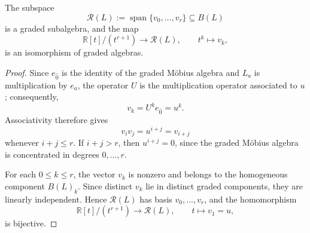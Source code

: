 \documentclass[10pt,a4paper]{amsart}
\DeclareMathOperator{\Span}{span}
\newcommand{\R}{\mathbb{R}}
\newcommand{\cc}{\mathcal}
\begin{document}
\begin{prop}\label{prop:radial-core}
The subspace
\[
\cc R(L):=\Span\{v_0,\ldots,v_r\}\subseteq B(L)
\]
is a graded subalgebra, and the map
\[
\R[t]/(t^{r+1})\longrightarrow \cc R(L),
\qquad
t^k\longmapsto v_k,
\]
is an isomorphism of graded algebras.
\end{prop}

\begin{proof}
Since $e_{\hat 0}$ is the identity of the graded M\"obius algebra and
$L_a$ is multiplication by $e_a$, the operator $U$
is the multiplication operator associated to $u$; consequently,
\[
v_k=U^ke_{\hat 0}=u^k.
\]
Associativity therefore gives
\[
v_iv_j=u^{i+j}=v_{i+j}
\]
whenever $i+j\le r$.  If $i+j>r$, then $u^{i+j}=0$, since the graded
M\"obius algebra is concentrated in degrees $0,\ldots,r$.

For each $0\le k\le r$, the vector $v_k$ is nonzero and belongs to the
homogeneous component $B(L)_k$.  Since distinct $v_k$ lie in distinct
graded components, they are linearly independent.  Hence
$\cc R(L)$ has basis $v_0,\ldots,v_r$, and the homomorphism
\[
\R[t]/(t^{r+1})\to\cc R(L),\qquad t\mapsto v_1=u,
\]
is bijective. \qedhere
\end{proof}
\end{document}
